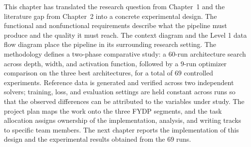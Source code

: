 This chapter has translated the research question from Chapter~1 and the literature gap from Chapter~2 into a concrete experimental design. The functional and nonfunctional requirements describe what the pipeline must produce and the quality it must reach. The context diagram and the Level 1 data flow diagram place the pipeline in its surrounding research setting. The methodology defines a two-phase comparative study: a $60$-run architecture search across depth, width, and activation function, followed by a $9$-run optimizer comparison on the three best architectures, for a total of $69$ controlled experiments. Reference data is generated and verified across two independent solvers; training, loss, and evaluation settings are held constant across runs so that the observed differences can be attributed to the variables under study. The project plan maps the work onto the three FYDP segments, and the task allocation assigns ownership of the implementation, analysis, and writing tracks to specific team members. The next chapter reports the implementation of this design and the experimental results obtained from the $69$ runs.
